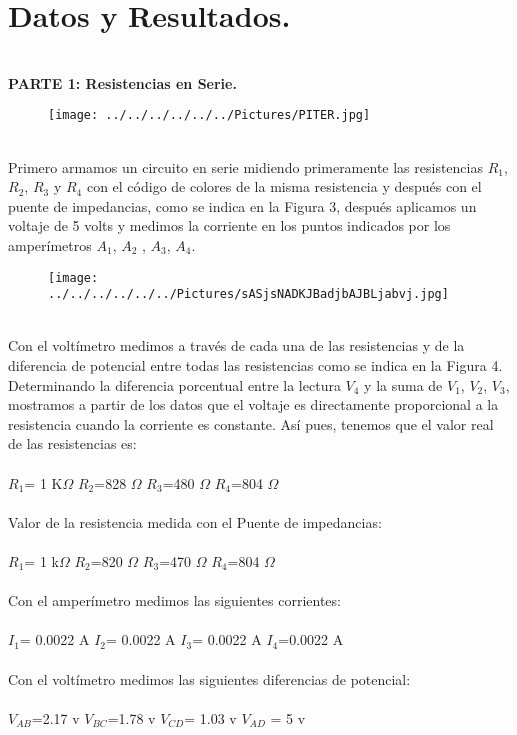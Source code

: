 \documentclass[11pt,a4paper]{article}
\begin{document}
\section{Datos y Resultados.}\\
\textbf{PARTE 1: Resistencias en Serie.}
\\
\begin{figure}[hbtp]
\centering
\texttt{[image: ../../../../../../Pictures/PITER.jpg]}
\end{figure}
\\
Primero armamos un circuito en serie midiendo primeramente las resistencias ${R}_{1}$, ${R}_{2}$, ${R}_{3}$ y ${R}_{4}$ con el c\'{o}digo de colores de la misma resistencia y despu\'{e}s con el puente de impedancias, como se indica en la Figura 3, despu\'{e}s aplicamos un voltaje de 5 volts y medimos la corriente en los puntos indicados por los amper\'{i}metros ${A}_{1}$, ${A}_{2}$ , ${A}_{3}$, ${A}_{4}$. 
\begin{figure}[hbtp]
\centering
\texttt{[image: ../../../../../../Pictures/sASjsNADKJBadjbAJBLjabvj.jpg]}
\end{figure}
\\
Con el volt\'{i}metro medimos a trav\'{e}s de cada una de las resistencias y de la diferencia de potencial entre todas las resistencias como se indica en la Figura 4. Determinando la diferencia porcentual entre la lectura ${V}_{4}$ y la suma de ${V}_{1}$, ${V}_{2}$, ${V}_{3}$, mostramos a partir de los datos que el voltaje es directamente proporcional a la resistencia cuando la corriente es constante. As\'{i} pues, tenemos que el valor real de las resistencias es:
\\
\\
${R}_{1}$= 1 K$\Omega$         ${R}_{2}$=828 $\Omega$      ${R}_{3}$=480 $\Omega$       ${R}_{4}$=804 $\Omega$ 
\\
\\
Valor de la resistencia medida con el Puente de impedancias:
\\
\\
${R}_{1}$= 1 k$\Omega$        ${R}_{2}$=820 $\Omega$      ${R}_{3}$=470 $\Omega$       ${R}_{4}$=804 $\Omega$
\\
\\
Con el amper\'{i}metro medimos las siguientes corrientes:
\\
\\
       ${I}_{1}$= 0.0022 A       ${I}_{2}$= 0.0022 A     ${I}_{3}$= 0.0022 A    ${I}_{4}$=0.0022 A
\\
\\
Con el volt\'{i}metro medimos las siguientes diferencias de potencial:
\\
\\
      ${V}_{AB}$=2.17 v    ${V}_{BC}$=1.78 v    ${V}_{CD}$= 1.03 v     ${V}_{AD}$ = 5 v
       
\end{document}
